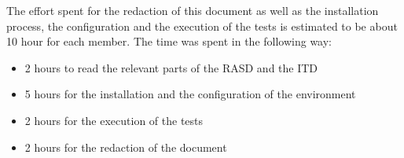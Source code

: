 The effort spent for the redaction of this document as well as the installation process, the configuration and the execution of the tests is estimated to be about 10 hour for each member. The time was spent in the following way:
\begin{itemize}
    \item 2 hours to read the relevant parts of the RASD and the ITD
    \item 5 hours for the installation and the configuration of the environment
    \item 2 hours for the execution of the tests
    \item 2 hours for the redaction of the document
\end{itemize}